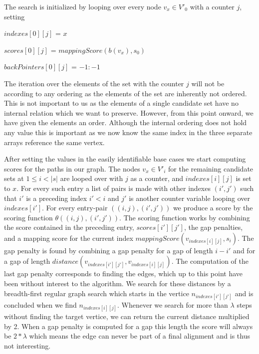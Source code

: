 \documentclass[thesis.tex]{subfiles}
\begin{document}
The search is initialized by looping over every node $v_x \in V'_0$ with a counter $j$, setting\\
\par
$indexes[0][j]$ = $x$\par
$scores[0][j]$ = $mappingScore(b(v_x), s_0)$\par
$backPointers[0][j]$ = $-1:-1$\\
\par\noindent
The iteration over the elements of the set with the counter $j$ will not be according to any ordering as the elements of the set are inherently not ordered. This is not important to us as the elements of a single candidate set have no internal relation which we want to preserve. However, from this point onward, we have given the elements an order. Although the internal ordering does not hold any value this is important as we now know the same index in the three separate arrays reference the same vertex.\\
\par\noindent
After setting the values in the easily identifiable base cases we start computing scores for the paths in our graph. The nodes $v_x \in V'_i$ for the remaining candidate sets at $1 \leq i < |s|$ are looped over with $j$ as a counter, and $indexes[i][j]$ is set to $x$. For every such entry a list of pairs is made with other indexes $(i', j')$ such that $i'$ is a preceding index $i'<i$ and $j'$ is another counter variable looping over $indexes[i']$. For every entry-pair $((i, j), (i', j'))$ we produce a score by the scoring function $\theta((i, j), (i', j'))$. The scoring function works by combining the score contained in the preceding entry, $scores[i'][j']$, the gap penalties, and a mapping score for the current index $mappingScore(v_{indexes[i][j]}, s_i)$. The gap penalty is found by combining a gap penalty for a gap of length $i-i'$ and for a gap of length $distance(v_{indexes[i'][j']}, v_{indexes[i][j]})$. The computation of the last gap penalty corresponds to finding the edges, which up to this point have been without interest to the algorithm. We search for these distances by a breadth-first regular graph search which starts in the vertice $n_{indexes[i'][j']}$ and is concluded when we find $n_{indexes[i][j]}$. Whenever we search for more than $\lambda$ steps without finding the target vertice, we can return the current distance multiplied by 2. When a gap penalty is computed for a gap this length the score will always be $2*\lambda$ which means the edge can never be part of a final alignment and is thus not interesting. \\
\end{document}
